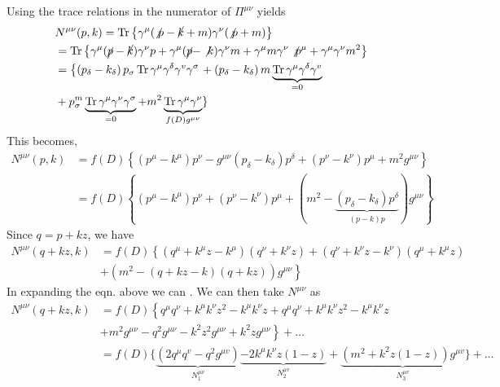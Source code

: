 Using the trace relations in the numerator of $\Pi^{\mu\nu}$ yields
$$\begin{aligned}
&N^{\mu \nu}(p, k)=\operatorname{Tr}\left\{\gamma^{\mu}(\not p-\cancel{k}+m) \gamma^{\nu}(\not p+m)\right\}\\
&=\operatorname{Tr}\left\{\gamma^{\mu}(\cancel{p}-\cancel{k}) \gamma^{\nu} p+\gamma^{\mu}(\cancel{p}-\not k) \gamma^{\nu} m+\gamma^{\mu} m \gamma^{\nu} \not p^{\mu}+\gamma^{\mu} \gamma^{\nu} m^{2}\right\}\\
&=\left\{\left(p_{\delta}-k_{\delta}\right) p_{\sigma} \operatorname{Tr} \gamma^{\mu} \gamma^{\delta} \gamma^{v} \gamma^{\sigma}\right.+\left(p_{\delta}-k_{\delta}\right) m \underbrace{\operatorname{Tr} \gamma^{\mu} \gamma^{\delta} \gamma^{v}}_{=0}\\
&+p_{\sigma}^{m} \underbrace{\operatorname{Tr} \gamma^{\mu} \gamma^{\nu} \gamma^{\sigma}}_{=0}+m^{2} \underbrace{\operatorname{Tr} \gamma^{\mu} \gamma^{\nu}}_{f(D) g^{\mu \nu}}\}
\end{aligned}$$
This becomes,
$$\begin{aligned}
N^{\mu \nu}(p, k) &=f(D)\left\{\left(p^{\mu}-k^{\mu}\right) p^{\nu}-g^{\mu \nu}\left(p_{\delta}-k_{\delta}\right) p^{\delta}+\left(p^{\nu}-k^{\nu}\right) p^{\mu}+m^{2} g^{\mu \nu}\right\} \\
&=f(D)\left\{\left(p^{\mu}-k^{\mu}\right) p^{\nu}+\left(p^{\nu}-k^{\nu}\right) p^{\mu}+(m^{2}-\underbrace{\left(p_{\delta}-k_{\delta}\right) p^{\delta}}_{(p-k) p}) g^{\mu \nu}\right\}
\end{aligned}$$
Since $q=p+kz$, we have
$$\begin{aligned}
N^{\mu \nu}(q+k z, k)&=f(D)\left\{\left(q^{\mu}+k^{\mu} z-k^{\mu}\right)\left(q^{\nu}+k^{\nu} z\right)+\left(q^{\nu}+k^{\nu} z-k^{\nu}\right)\left(q^{\mu}+k^{\mu} z\right)\right.\\
&+\left.\left(m^{2}-(q+k z-k)(q+k z)\right) g^{\mu \nu}\right\}
\end{aligned}$$
In expanding the eqn. above we can . We can then take $N^{\mu\nu}$ as
\begin{equation}\begin{aligned}
N^{\mu \nu}(q+k z, k)&=f(D)\left\{q^{\mu} q^{\nu}+k^{\mu} k^{\nu} z^{2}-k^{\mu} k^{\nu} z+q^{\mu} q^{\nu}+k^{\mu} k^{\nu} z^{2}-k^{\mu} k^{\nu} z\right.\\
&\left.+m^{2} g^{\mu \nu}-q^{2} g^{\mu \nu}-k^{2} z^{2} g^{\mu \nu}+k^{2} z g^{\mu \nu}\right\}+\ldots\\
&=f(D)\{\underbrace{\left(2 q^{\mu} q^{v}-q^{2} g^{\mu v}\right)}_{N_1^{\mu\nu}} \underbrace{-2 k^{\mu} k^{\nu} z(1-z)}_{N_{2}^{\mu v}}+\underbrace{\left(m^{2}+k^{2} z(1-z)\right) g^{\mu v}}_{N_{3}^{\mu v}}\}+\ldots
\end{aligned}\end{equation}
